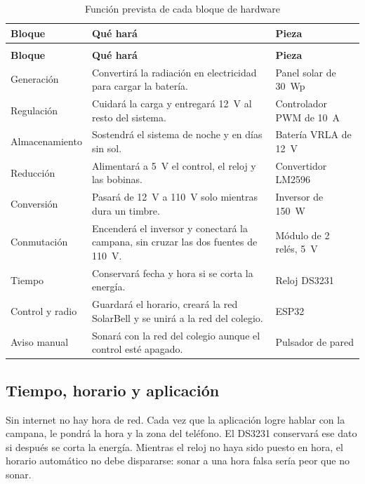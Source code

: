 \documentclass[12pt,letterpaper]{article}
\begin{document}
\begin{longtable}{>{\raggedright\arraybackslash}p{} >{\raggedright\arraybackslash}p{} >{\raggedright\arraybackslash}p{}}
\caption{Función prevista de cada bloque de hardware}\label{tab:piezas}\\
\toprule
\textbf{Bloque} & \textbf{Qué hará} & \textbf{Pieza} \\
\midrule
\endfirsthead
\multicolumn{3}{l}{\small\textit{Continuación de la Tabla \ref{tab:piezas}}}\\
\toprule
\textbf{Bloque} & \textbf{Qué hará} & \textbf{Pieza} \\
\midrule
\endhead
\bottomrule
\endfoot
Generación & Convertirá la radiación en electricidad para cargar la batería. & Panel solar de 30~Wp \\
\addlinespace
Regulación & Cuidará la carga y entregará 12~V al resto del sistema. & Controlador PWM de 10~A \\
\addlinespace
Almacenamiento & Sostendrá el sistema de noche y en días sin sol. & Batería VRLA de 12~V \\
\addlinespace
Reducción & Alimentará a 5~V el control, el reloj y las bobinas. & Convertidor LM2596 \\
\addlinespace
Conversión & Pasará de 12~V a 110~V solo mientras dura un timbre. & Inversor de 150~W \\
\addlinespace
Conmutación & Encenderá el inversor y conectará la campana, sin cruzar las dos fuentes de 110~V. & Módulo de 2 relés, 5~V \\
\addlinespace
Tiempo & Conservará fecha y hora si se corta la energía. & Reloj DS3231 \\
\addlinespace
Control y radio & Guardará el horario, creará la red SolarBell y se unirá a la red del colegio. & ESP32 \\
\addlinespace
Aviso manual & Sonará con la red del colegio aunque el control esté apagado. & Pulsador de pared \\
\end{longtable}

\subsection*{Tiempo, horario y aplicación}

Sin internet no hay hora de red. Cada vez que la aplicación logre hablar con la campana, le pondrá la hora y la zona del teléfono. El DS3231 conservará ese dato si después se corta la energía. Mientras el reloj no haya sido puesto en hora, el horario automático no debe dispararse: sonar a una hora falsa sería peor que no sonar.
\end{document}
